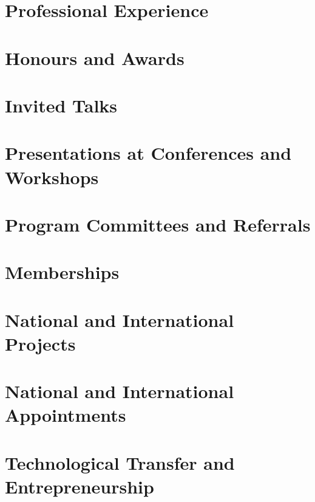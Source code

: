 \documentclass[10pt,a4paper]{article}
\begin{document}
\section*{Professional Experience}


\section*{Honours and Awards}










\newpage
{}




\section*{Invited Talks}%


\section*{Presentations at Conferences and Workshops}%


\section*{Program Committees and Referrals}%


\section*{Memberships}%


\section*{National and International Projects}%


\section*{National and International Appointments}%


\section*{Technological Transfer and Entrepreneurship}%

\end{document}
